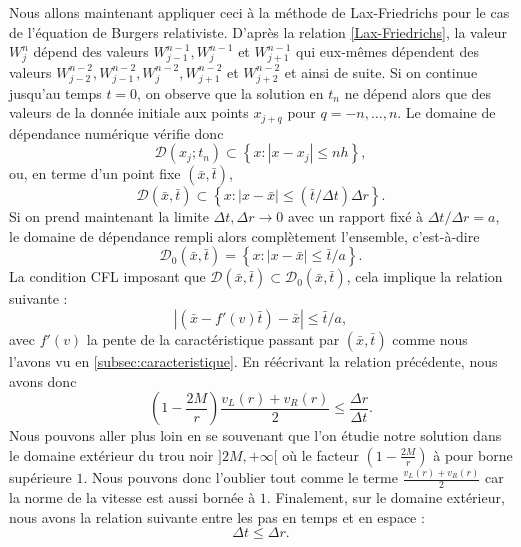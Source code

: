 \documentclass[11pt,a4paper]{article}
\begin{document}
Nous allons maintenant appliquer ceci à la méthode de Lax-Friedrichs pour le cas de l'équation de Burgers relativiste. D'après la relation \eqref{Lax-Friedrichs}, la valeur $W_j^n$ dépend des valeurs $W^{n-1}_{j-1}, W^{n-1}_{j}$ et $W^{n-1}_{j+1}$ qui eux-mêmes dépendent des valeurs $W^{n-2}_{j-2}, W^{n-2}_{j-1}, W^{n-2}_{j}, W^{n-2}_{j+1}$ et $W^{n-2}_{j+2}$ et ainsi de suite. Si on continue jusqu'au temps $t=0$, on observe que la solution en $t_n$ ne dépend alors que des valeurs de la donnée initiale aux points $x_{j+q}$ pour $q = -n,\dots,n$. Le domaine de dépendance numérique vérifie donc
\begin{equation}
	\mathcal{D}(x_j;t_n)\subset \left\{x: |x-x_j|\leq nh\right\},
\end{equation}
ou, en terme d'un point fixe $(\bar{x},\bar{t})$,
\begin{equation}
	\mathcal{D}(\bar{x},\bar{t})\subset \left\{x:|x-\bar{x}|\leq (\bar{t}/\Delta t)\Delta r \right\}.
\end{equation}
Si on prend maintenant la limite $\Delta t, \Delta r \rightarrow 0$ avec un rapport fixé à $\Delta t/\Delta r = a$, le domaine de dépendance rempli alors complètement l'ensemble, c'est-à-dire
\begin{equation}
	\mathcal{D}_0(\bar{x},\bar{t}) = \left\{x: |x-\bar{x}|\leq \bar{t}/a\right\}.
\end{equation}
La condition CFL imposant que $\mathcal{D}(\bar{x},\bar{t}) \subset\mathcal{D}_0(\bar{x}, \bar{t})$, cela implique la relation suivante :
\begin{equation}
	|(\bar{x} - f'(v)\bar{t}) -\bar{x}|\leq \bar{t}/a,
\end{equation}
avec $f'(v)$ la pente de la caractéristique passant par $(\bar{x}, \bar{t})$ comme nous l'avons vu en \ref{subsec:caracteristique}. En réécrivant la relation précédente, nous avons donc
\begin{equation}
	\left(1-\frac{2M}{r}\right)\frac{v_L(r) + v_R(r)}{2} \leq \frac{\Delta r}{\Delta t}.
\end{equation}
Nous pouvons aller plus loin en se souvenant que l'on étudie notre solution dans le domaine extérieur du trou noir $]2M, +\infty[$ où le facteur $\left(1-\frac{2M}{r}\right)$ à pour borne supérieure $1$. Nous pouvons donc l'oublier tout comme le terme $\frac{v_L(r) + v_R(r)}{2}$ car la norme de la vitesse est aussi bornée à $1$. Finalement, sur le domaine extérieur, nous avons la relation suivante entre les pas en temps et en espace : 
\begin{equation}
	\Delta t \leq \Delta r.
\end{equation}
\end{document}
